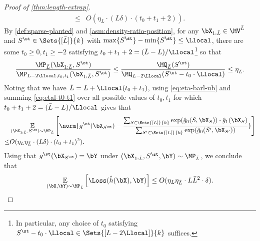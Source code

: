 \documentclass{article}
\begin{document}
\begin{proof}[Proof of \cref{thm:length-extrap}]
\begin{align}
            \leq & O(\eta_L \cdot  (L \delta) \cdot (t_0 + t_1 + 2))\label{eq:etal-t0-t1}.
          \end{align}
          By \cref{def:sparse-planted} and \cref{asm:density-ratio-position}, for any $\bX_{1:\bar L} \in \MV^{\bar L}$ and $S^\st \in \Sets{[\bar L]}{k}$ with $\max\{S^\st \} - \min\{ S^\st\} \leq \Llocal$, there are some $t_0 \geq 0, t_1 \geq -2$ satisfying $t_0 + t_1 + 2 = (\bar L - L) / \Llocal$\footnote{In particular, any choice of $t_0$ satisfying $S^\st - t_0 \cdot \Llocal \in \Sets{[L - 2\Llocal]}{k}$ suffices.}  %
          so that
          \begin{align}
\frac{\MP_{\bar L}(\bX_{1:\bar L}, S^\st)}{\MP_{L-2\Llocal, t_0, t_1}(\bX_{1:\bar L}, S^\st)} \leq \frac{\MQ_{\bar L}(S^\st)}{\MQ_{L-2\Llocal}(S^\st - t_0 \cdot \Llocal)} \leq \eta_{\bar L} \label{eq:eta-barl-ub}.
          \end{align}
Noting that we have $\bar L = L + \Llocal(t_0 + t_1)$, using \cref{eq:eta-barl-ub} and summing \cref{eq:etal-t0-t1} over all possible values of $t_0,t_1$ for which $t_0 + t_1 + 2 = (\bar L - L)/\Llocal$ gives that
          \begin{align}
            & \E_{(\bX_{1:\bar L}, S^\st) \sim \MP_{\bar L}}\left[ \norm{ g^\st(\bX_{S^\st}) - \frac{\sum_{S \in \Sets{[\bar L]}{k}} \exp(\hat g_0(S, \bX_S)) \cdot \hat g_1(\bX_S)}{\sum_{S' \in \Sets{[\bar L]}{k}} \exp(\hat g_0(S', \bX_{S'}))} } \right]\nonumber\\
            \leq & O(\eta_L \eta_{\bar L} \cdot (L \delta) \cdot (t_0 + t_1)^2)\nonumber.
          \end{align}
          Using that $g^\st(\bX_{S^\st}) = \bY$ under $(\bX_{1:\bar L}, S^\st, \bY) \sim \MP_{\bar L}$, we conclude that
          \begin{align}
\E_{(\bX, \bY) \sim \MP_{\bar L}} \left[ \Loss(\hat h(\bX), \bY)\right] \leq O(\eta_L \eta_{\bar L} \cdot L \bar L^2 \cdot \delta)\nonumber.
          \end{align}
\end{proof}
\end{document}
